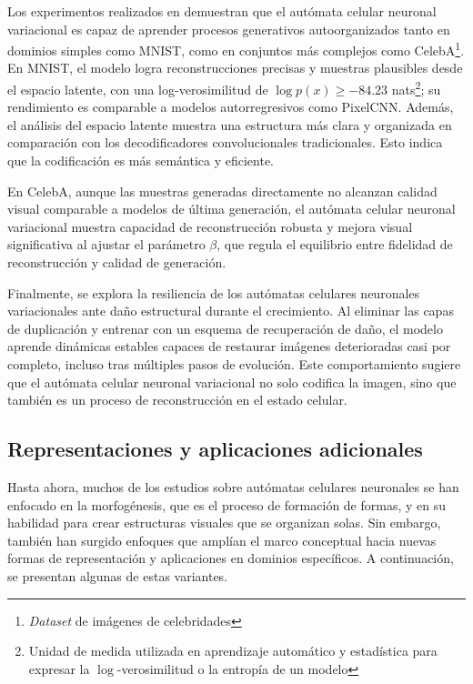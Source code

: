 Los experimentos realizados en \cite{rasmus2022_vnca} demuestran que el autómata celular neuronal variacional es capaz de aprender procesos generativos autoorganizados tanto en dominios simples como MNIST, como en conjuntos más complejos como CelebA\footnote{\textit{Dataset} de imágenes de celebridades}. En MNIST, el modelo logra reconstrucciones precisas y muestras plausibles desde el espacio latente, con una log-verosimilitud de $\log p(x) \geq -84.23$ nats\footnote{Unidad de medida utilizada en aprendizaje automático y estadística para expresar la $\log$-verosimilitud o la entropía de un modelo}; su rendimiento es comparable a modelos autorregresivos como PixelCNN. Además, el análisis del espacio latente muestra una estructura más clara y organizada en comparación con los decodificadores convolucionales tradicionales. Esto indica que la codificación es más semántica y eficiente.

En CelebA, aunque las muestras generadas directamente no alcanzan calidad visual comparable a modelos de última generación, el autómata celular neuronal variacional muestra capacidad de reconstrucción robusta y mejora visual significativa al ajustar el parámetro $\beta$, que regula el equilibrio entre fidelidad de reconstrucción y calidad de generación. 

Finalmente, se explora la resiliencia de los autómatas celulares neuronales variacionales ante daño estructural durante el crecimiento. Al eliminar las capas de duplicación y entrenar con un esquema de recuperación de daño, el modelo aprende dinámicas estables capaces de restaurar imágenes deterioradas casi por completo, incluso tras múltiples pasos de evolución. Este comportamiento sugiere que el autómata celular neuronal variacional no solo codifica la imagen, sino que también es un proceso de reconstrucción en el estado celular.

\subsection{Representaciones y aplicaciones adicionales}

Hasta ahora, muchos de los estudios sobre autómatas celulares neuronales se han enfocado en la morfogénesis, que es el proceso de formación de formas, y en su habilidad para crear estructuras visuales que se organizan solas. Sin embargo, también han surgido enfoques que amplían el marco conceptual hacia nuevas formas de representación y aplicaciones en dominios específicos. A continuación, se presentan algunas de estas variantes.

